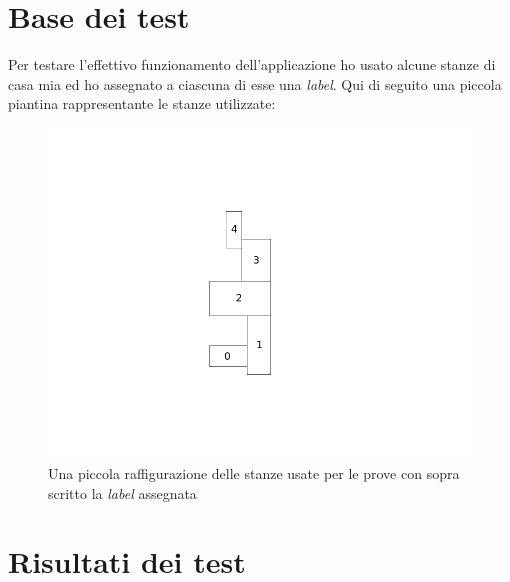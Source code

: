 \section*{Base dei test}
Per testare l'effettivo funzionamento dell'applicazione ho usato alcune stanze di casa mia ed ho assegnato a ciascuna di esse una \textit{label}. Qui di seguito una piccola piantina rappresentante le stanze utilizzate:

\begin{figure}[H]
\centering
\includegraphics[width=0.7\linewidth]{img/test_pianta_casa}
\caption{Una piccola raffigurazione delle stanze usate per le prove con sopra scritto la \textit{label} assegnata}
\label{fig:test_pianta_casa}
\end{figure}

\section*{Risultati dei test}

